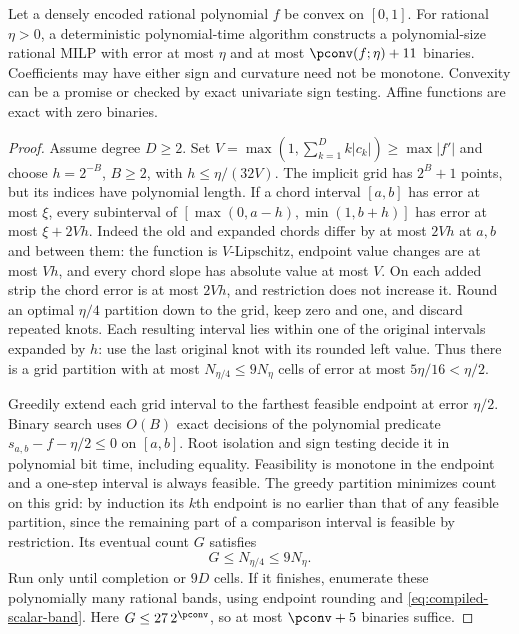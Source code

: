 \begin{theorem}\label{thm:convex-hybrid}
Let a densely encoded rational polynomial $f$ be convex on $[0,1]$.
For rational $\eta>0$, a deterministic polynomial-time algorithm
constructs a polynomial-size rational MILP with error at most $\eta$
and at most $\pconv(f;\eta)+11$ binaries. Coefficients may have either
sign and curvature need not be monotone. Convexity can be a promise or
checked by exact univariate sign testing. Affine functions are exact
with zero binaries.
\end{theorem}
\begin{proof}
Assume degree $D\ge2$. Set
$V=\max(1,\sum_{k=1}^Dk|c_k|)\ge\max|f'|$ and choose
$h=2^{-B}$, $B\ge2$, with $h\le\eta/(32V)$. The implicit grid
has $2^B+1$ points, but its indices have polynomial length.
If a chord interval $[a,b]$ has error at most $\xi$, every subinterval
of $[\max(0,a-h),\min(1,b+h)]$ has error at most $\xi+2Vh$.
Indeed the old and expanded chords differ by at most $2Vh$ at $a,b$
and between them: the function is $V$-Lipschitz, endpoint value changes are at most
$Vh$, and every chord slope has absolute value at most $V$.
On each added strip the chord error is at most $2Vh$, and restriction
does not increase it. Round an optimal $\eta/4$ partition down to the
grid, keep zero and one, and discard repeated knots. Each resulting
interval lies within one of the original intervals expanded by $h$:
use the last original knot with its rounded left value. Thus there
is a grid partition with at most $N_{\eta/4}\le9N_\eta$ cells of
error at most $5\eta/16<\eta/2$.

Greedily extend each grid interval to the farthest feasible endpoint
at error $\eta/2$. Binary search uses $O(B)$ exact decisions of the
polynomial predicate $s_{a,b}-f-\eta/2\le0$ on $[a,b]$.
Root isolation and sign testing decide it in polynomial bit time,
including equality. Feasibility is monotone in the endpoint and a
one-step interval is always feasible. The greedy partition minimizes
count on this grid: by induction its $k$th endpoint is no earlier than
that of any feasible partition, since the remaining part of a comparison
interval is feasible by restriction. Its eventual count $G$ satisfies
\begin{equation}\label{eq:hybrid-greedy-count}
 G\le N_{\eta/4}\le9N_\eta.
\end{equation}
Run only until completion or $9D$ cells. If it finishes, enumerate
these polynomially many rational bands, using endpoint rounding and
\eqref{eq:compiled-scalar-band}. Here
$G\le27\,2^{\pconv}$, so at most $\pconv+5$ binaries suffice.


\end{proof}
